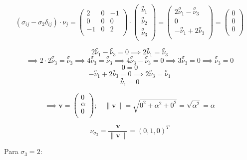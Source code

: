 \documentclass[a4paper,12pt,twoside,final,spanish]{article}
\begin{document}
\[
(\sigma_{ij}-\sigma_{2}\delta_{ij})\cdot\nu_{j}=
\left(\begin{matrix}
2 & 0 & -1 \\
0 & 0 & 0 \\
-1 & 0 & 2 \\
\end{matrix}\right)\cdot
\left(\begin{matrix}
\stackrel \sigma \nu_{1} \\
\stackrel \sigma \nu_{2} \\
\stackrel \sigma \nu_{3} \\
\end{matrix}\right)
=
\left(\begin{matrix}
2\stackrel \sigma \nu_{1}-\stackrel \sigma \nu_{3} \\
0 \\
-\stackrel \sigma \nu_{1}+2\stackrel \sigma \nu_{3} \\
\end{matrix}\right)
=
\left(\begin{matrix}
0 \\
0 \\
0 \\
\end{matrix}\right)
\]

\[
2\stackrel \sigma \nu_{1}-\stackrel \sigma \nu_{3}=0
\implies 2\stackrel \sigma \nu_{1}=\stackrel \sigma \nu_{3}
\]
\[
\implies 2\cdot2\stackrel \sigma \nu_{3}=\stackrel \sigma \nu_{3}
\implies 4\stackrel \sigma \nu_{3}=\stackrel \sigma \nu_{3}
\implies 4\stackrel \sigma \nu_{3}-\stackrel \sigma \nu_{3}=0
\implies 3\stackrel \sigma \nu_{3}=0
\implies \stackrel \sigma \nu_{3}=0
\]
\[
0=0
\]
\[
-\stackrel \sigma \nu_{1}+2\stackrel \sigma \nu_{3}=0
\implies 2\stackrel \sigma \nu_{3}=\stackrel \sigma \nu_{1}
\]
\[
\stackrel \sigma \nu_{1}=0
\]

\[
\implies
\mathbf{v}=\left(\begin{matrix}
0 \\
\alpha \\
0 \\
\end{matrix}\right);\quad
\|\mathbf{v}\|
=\sqrt{0^2+\alpha^2+0^2}=\sqrt{\alpha^2}=\alpha
\]

\[
\nu_{\sigma_{2}}=\frac{\mathbf{v}}{\|\mathbf{v}\|}
=
\left(0,1,0\right)^{T}
\]

Para $\sigma_{3}=2$:
\end{document}
